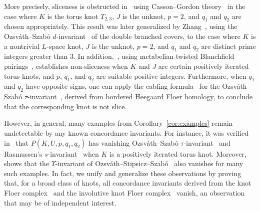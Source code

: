 \documentclass[11pt, reqno]{amsart}
\newtheorem{proposition}[theorem]{Proposition}
\theoremstyle{definition}
\theoremstyle{remark}
\numberwithin{equation}{section}
\begin{document}
More precisely, sliceness is obstructed in~\cite[Theorem 3]{Hedden-Kirk-Livingston:2012} using Casson--Gordon theory~\cite{Casson-Gordon:1986} in the case where $K$ is the torus knot $T_{2,3}$, $J$ is the unknot, $p = 2$, and $q_1$ and $q_2$ are chosen appropriately. This result was later generalized by Zhang~\cite[Theorem 2]{Zhang}, using the Ozsv\'{a}th--Szab\'{o} $d$-invariant~\cite{Oz-Sz:dinvt} of the double branched covers, to the case where $K$ is a nontrivial $L$-space knot, $J$ is the unknot, $p = 2$, and $q_1$ and $q_2$ are distinct prime integers greater than $3$.
In addition,~\cite[Theorem 1.1]{Conway-Kim-Politarczyk:2023}, using metabelian twisted Blanchfield pairings~\cite{Miller-Powell:2018,BCP:2022-1,BCP:2018-1,BCP:2024-3}, establishes non-sliceness when $K$ and $J$ are certain positively iterated torus knots, and $p$, $q_1$, and $q_2$ are suitable positive integers.
Furthermore, when $q_1$ and $q_2$ have opposite signs, one can apply 
the cabling formula~\cite{Hom:2014}  for the Ozsv\'{a}th--Szab\'{o} $\tau$-invariant~\cite{Oz-Sz:2003}, derived from bordered Heegaard Floer homology, to conclude that the corresponding knot is not slice.





However, in general, many examples from Corollary~\ref{cor:examples} remain undetectable by any known concordance invariants.  
For instance, it was verified in~\cite[Proposition 8.2]{Hedden-Kirk-Livingston:2012} that $P(K, U, p, q_1, q_2)$ has vanishing Ozsv\'{a}th--Szab\'{o} $\tau$-invariant~\cite{Oz-Sz:2003} and Rasmussen's $s$-invariant~\cite{Rasmussen:2010} when $K$ is a positively iterated torus knot.  
Moreover,~\cite[Section 1.2]{Conway-Kim-Politarczyk:2023} shows that the $\Upsilon$-invariant of Ozsv\'{a}th--Stipsicz--Szab\'{o}~\cite{OSS:2017} also vanishes for many such examples.  
In fact, we unify and generalize these observations by proving that, for a broad class of knots, all concordance invariants derived from the knot Floer complex~\cite{OS-knots, Rasmussen-thesis} and the involutive knot Floer complex~\cite{HendricksManolescu} vanish, an observation that may be of independent interest.









\end{document}
